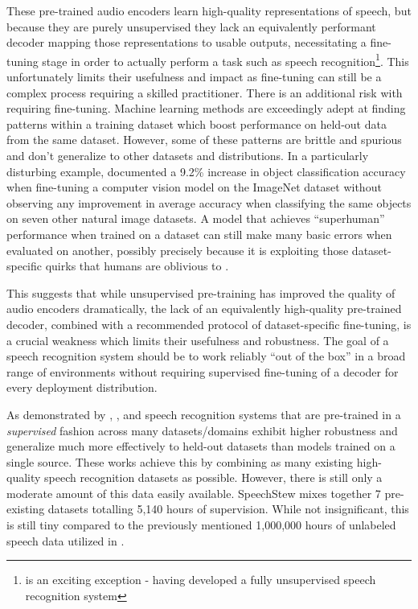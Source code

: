 \documentclass[nohyperref]{article}
\theoremstyle{plain}
\theoremstyle{definition}
\theoremstyle{remark}
\begin{document}
These pre-trained audio encoders learn high-quality representations of speech, but because they are purely unsupervised they lack an equivalently performant decoder mapping those representations to usable outputs, necessitating a fine-tuning stage in order to actually perform a task such as speech recognition\footnote{\citet{baevski2021unsupervised} is an exciting exception - having developed a fully unsupervised speech recognition system}. This unfortunately limits their usefulness and impact as fine-tuning can still be a complex process requiring a skilled practitioner. There is an additional risk with requiring fine-tuning. Machine learning methods are exceedingly adept at finding patterns within a training dataset which boost performance on held-out data from the same dataset. However, some of these patterns are brittle and spurious and don't generalize to other datasets and distributions. In a particularly disturbing example, \citet{radford2021clip} documented a 9.2\% increase in object classification accuracy when fine-tuning a computer vision model on the ImageNet dataset \cite{russakovsky2015imagenet} without observing any improvement in average accuracy when classifying the same objects on seven other natural image datasets. A model that achieves ``superhuman'' performance when trained on a dataset can still make many basic errors when evaluated on another, possibly precisely because it is exploiting those dataset-specific quirks that humans are oblivious to \cite{geirhos2020shortcut}.

This suggests that while unsupervised pre-training has improved the quality of audio encoders dramatically, the lack of an equivalently high-quality pre-trained decoder, combined with a recommended protocol of dataset-specific fine-tuning, is a crucial weakness which limits their usefulness and robustness. The goal of a speech recognition system should be to work reliably ``out of the box'' in a broad range of environments without requiring supervised fine-tuning of a decoder for every deployment distribution.

As demonstrated by \citet{narayanan2018toward}, \citet{likhomanenko2020rethinking}, and \citet{chan2021speechstew} speech recognition systems that are pre-trained in a \textit{supervised} fashion across many datasets/domains exhibit higher robustness and generalize much more effectively to held-out datasets than models trained on a single source. These works achieve this by combining as many existing high-quality speech recognition datasets as possible. However, there is still only a moderate amount of this data easily available. SpeechStew \cite{chan2021speechstew} mixes together 7 pre-existing datasets totalling 5,140 hours of supervision. While not insignificant, this is still tiny compared to the previously mentioned 1,000,000 hours of unlabeled speech data utilized in \citet{zhang2021bigssl}.
\end{document}
